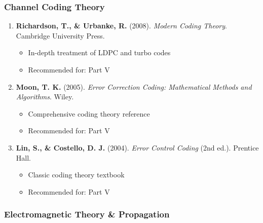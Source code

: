\subsubsection{Channel Coding Theory}\label{channel-coding-theory}

\begin{enumerate}
\def\labelenumi{\arabic{enumi}.}
\setcounter{enumi}{6}
\tightlist
\item
  \textbf{Richardson, T., \& Urbanke, R.} (2008). \emph{Modern Coding
  Theory}. Cambridge University Press.

  \begin{itemize}
  \tightlist
  \item
    In-depth treatment of LDPC and turbo codes
  \item
    Recommended for: Part V
  \end{itemize}
\item
  \textbf{Moon, T. K.} (2005). \emph{Error Correction Coding:
  Mathematical Methods and Algorithms}. Wiley.

  \begin{itemize}
  \tightlist
  \item
    Comprehensive coding theory reference
  \item
    Recommended for: Part V
  \end{itemize}
\item
  \textbf{Lin, S., \& Costello, D. J.} (2004). \emph{Error Control
  Coding} (2nd ed.). Prentice Hall.

  \begin{itemize}
  \tightlist
  \item
    Classic coding theory textbook
  \item
    Recommended for: Part V
  \end{itemize}
\end{enumerate}

\subsubsection{Electromagnetic Theory \&
Propagation}\label{electromagnetic-theory-propagation}

